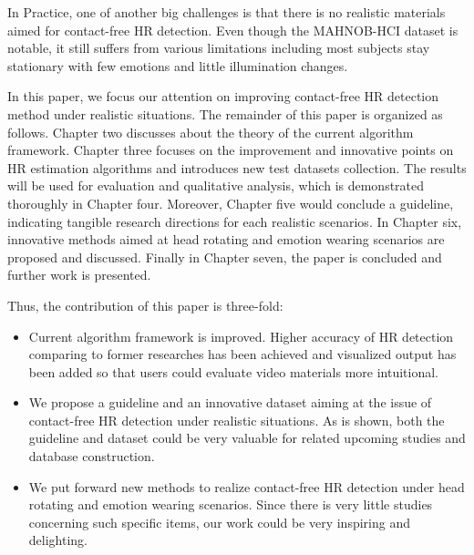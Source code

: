 In Practice, one of another big challenges is that there is no realistic materials aimed for contact-free HR detection. Even though the MAHNOB-HCI dataset is notable, it still suffers from various limitations including most subjects stay stationary with few emotions and little illumination changes.

In this paper, we focus our attention on improving contact-free HR detection method under realistic situations. The remainder of this paper is organized as follows. Chapter two discusses about the theory of the current algorithm framework. Chapter three focuses on the improvement and innovative points on HR estimation algorithms and introduces new test datasets collection. The results will be used for evaluation and qualitative analysis, which is demonstrated thoroughly in Chapter four. Moreover, Chapter five would conclude a guideline, indicating tangible research directions for each realistic scenarios. In Chapter six, innovative methods aimed at head rotating and emotion wearing scenarios are proposed and discussed. Finally in Chapter seven, the paper is concluded and further work is presented.

Thus, the contribution of this paper is three-fold:
\begin{itemize}
	\item Current algorithm framework is improved. Higher accuracy of HR detection comparing to former researches has been achieved and visualized output has been added so that users could evaluate video materials more intuitional.
	\item We propose a guideline and an innovative dataset aiming at the issue of contact-free HR detection under realistic situations. As is shown, both the guideline and dataset could be very valuable for related upcoming studies and database construction.
	\item We put forward new methods to realize contact-free HR detection under head rotating and emotion wearing scenarios. Since there is very little studies concerning such specific items, our work could be very inspiring and delighting.
\end{itemize}






